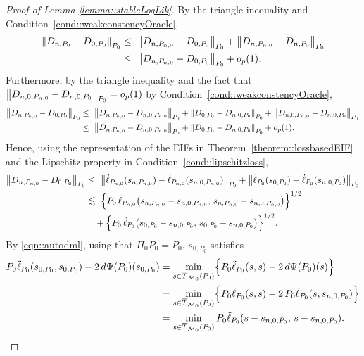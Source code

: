 \documentclass[11pt]{article}
\theoremstyle{definition}
\begin{document}
\begin{proof}[Proof of Lemma \ref{lemma::stableLogLik}]
By the triangle inequality and Condition~\ref{cond::weakconstencyOracle}, 
\begin{align*}
  \norm{D_{n,P_0} - D_{0,P_0}}_{P_0}
  &\leq\ \norm{D_{n,P_{n,0}} - D_{0,P_{0}}}_{P_0}
       + \norm{D_{n,P_{n,0}} - D_{n,P_0}}_{P_0} \\
  &\leq\ \norm{D_{n,P_{n,0}} - D_{0,P_{0}}}_{P_0} + o_p(1).
\end{align*}
Furthermore, by the triangle inequality and the fact that $\norm{D_{n,0,P_{n,0}} - D_{n,0,P_0}}_{P_0} = o_p(1)$ by Condition~\ref{cond::weakconstencyOracle}, 
\begin{align*}
    \norm{D_{n,P_{n,0}} - D_{0,P_{0}}}_{P_0}
    &\leq\ \norm{D_{n,P_{n,0}} - D_{n,0,P_{n,0}}}_{P_0} 
           + \norm{D_{0,P_0} - D_{n,0,P_0}}_{P_0} 
           + \norm{D_{n,0,P_{n,0}} - D_{n,0,P_0}}_{P_0} \\
    &\leq\ \norm{D_{n,P_{n,0}} - D_{n,0,P_{n,0}}}_{P_0} 
           + \norm{D_{0,P_0} - D_{n,0,P_0}}_{P_0} 
           + o_p(1).
\end{align*}
Hence, using the representation of the EIFs in Theorem~\ref{theorem::lossbasedEIF} and the Lipschitz property in Condition~\ref{cond::lipschitzloss}, 
\begin{align*}
    \norm{D_{n,P_{n,0}} - D_{0,P_{0}}}_{P_0}
    &\leq\ \norm{\dot{\ell}_{P_{n,0}}(s_{n,P_{n,0}}) - \dot{\ell}_{P_{n,0}}(s_{n,0,P_{n,0}})}_{P_0}
      + \norm{\dot{\ell}_{P_{0}}(s_{0,P_{0}}) - \dot{\ell}_{P_{0}}(s_{n,0,P_{0}})}_{P_0} \\
    &\lesssim\ \Bigl\{ P_0\,\ddot{\ell}_{P_{n,0}}\bigl(s_{n,P_{n,0}} - s_{n,0,P_{n,0}},\, s_{n,P_{n,0}} - s_{n,0,P_{n,0}}\bigr) \Bigr\}^{1/2} \\
    &\quad + \Bigl\{ P_0\,\ddot{\ell}_{P_{0}}\bigl(s_{0,P_{0}} - s_{n,0,P_{0}},\, s_{0,P_{0}} - s_{n,0,P_{0}}\bigr) \Bigr\}^{1/2}.
\end{align*}
By \eqref{eqn::autodml}, using that $\Pi_0 P_0 = P_0$, $s_{0,P_{0}}$ satisfies 
\begin{align*}
 P_0\ddot{\ell}_{P_0}(s_{0,P_{0}},s_{0,P_{0}}) - 2\, d\Psi(P_0)(s_{0,P_{0}})   
   &= \min_{s \in \overline{T}_{\mathcal{M}_0}(P_0)} \Bigl\{ P_0\ddot{\ell}_{P_0}(s,s) - 2\, d\Psi(P_0)(s) \Bigr\} \\
   &= \min_{s \in \overline{T}_{\mathcal{M}_0}(P_0)} \Bigl\{ P_0\ddot{\ell}_{P_0}(s,s) - 2\, P_0\ddot{\ell}_{P_0}(s,s_{n,0,P_0}) \Bigr\} \\
   &= \min_{s \in \overline{T}_{\mathcal{M}_0}(P_0)} P_0\ddot{\ell}_{P_0}(s - s_{n,0,P_0},\, s - s_{n,0,P_0}).
\end{align*}

\end{proof}
\end{document}
